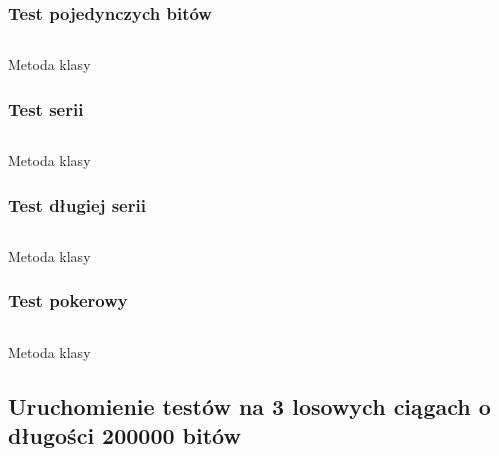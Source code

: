 \documentclass[12pt]{article}
\begin{document}
\subsubsection{Test pojedynczych bitów}

\begin{listing}[H]
	\inputminted[firstline=34,lastline=37]{python}{../fips.py}
	\caption{Metoda klasy}
\end{listing}

\subsubsection{Test serii}

\begin{listing}[H]
	\inputminted[firstline=39,lastline=56]{python}{../fips.py}
	\caption{Metoda klasy}
\end{listing}

\subsubsection{Test długiej serii}

\begin{listing}[H]
	\inputminted[firstline=58,lastline=65]{python}{../fips.py}
	\caption{Metoda klasy}
\end{listing}

\subsubsection{Test pokerowy}

\begin{listing}[H]
	\inputminted[firstline=67,lastline=79]{python}{../fips.py}
	\caption{Metoda klasy}
\end{listing}

\subsection{Uruchomienie testów na 3 losowych ciągach o długości 200000 bitów}

\inputminted{text}{1-test-1.txt}
\inputminted{text}{1-test-2.txt}
\inputminted{text}{1-test-3.txt}
\end{document}
